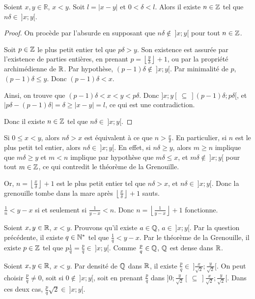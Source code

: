 \documentclass[]{../templates/homework}
\providecommand{\floor}[1]{\left \lfloor #1 \right \rfloor }
\begin{document}
\subproblem
\question
\begin{thm}
	Soient $x,y\in\mathbb R$, $x<y$. Soit $l = |x-y|$ et $0 < \delta < l$. Alors il existe $n\in \mathbb Z$ tel que $n\delta \in\ ]x;y[$.
\end{thm}
\begin{proof}
	On procède par l'absurde en supposant que $n\delta \not\in\ ]x;y[$ pour tout $n\in\mathbb Z$.
	
	Soit $p\in\mathbb Z$ le plus petit entier tel que $p\delta > y$. Son existence est assurée par l'existence de parties entières, en prenant $p = \floor {\frac y \delta} + 1$, ou par la propriété archimédienne de $\mathbb R$.
	Par hypothèse, $(p-1) \delta \not \in\ ]x;y[$. Par minimalité de $p$, $(p-1)\delta \leq y$. Donc $(p-1)\delta < x$.
	
	Ainsi, on trouve que $(p-1)\delta < x < y < p\delta$. Donc $]x;y[\ \subseteq \  ](p-1)\delta; p\delta[$, et $|p\delta - (p-1)\delta| = \delta \geq |x-y| = l$, ce qui est une contradiction.
	
	Donc il existe $n\in\mathbb Z$ tel que $n\delta \in \ ]x;y[$.
\end{proof}

\question Si $0 \leq x <y$, alors $n\delta > x$ est équivalent à ce que $n> \frac x \delta$. En particulier, si $n$ est le plus petit tel entier, alors $n\delta \in \ ]x;y[$. En effet, si $n\delta \geq y$, alors $m\geq n$ implique que $m\delta \geq y$ et $m < n$ implique par hypothèse que $m\delta \leq x$, et $m\delta \not\in\ ]x;y[$ pour tout $m\in\mathbb Z$, ce qui contredit le théorème de la Grenouille.

Or, $n = \floor {\frac x \delta} + 1$ est le plus petit entier tel que $n\delta > x$, et $n\delta \in\ ]x;y[$. Donc la grenouille tombe dans la mare après $\floor {\frac x \delta} + 1$ sauts.

\subproblem
\question $\frac 1 n < y-x$ si et seulement si $\frac 1 {y-x} < n$. Donc $n=\floor {\frac 1 {y-x}} + 1$ fonctionne.

\question Soient $x,y \in \mathbb R$, $x<y$. Prouvons qu'il existe $a\in\mathbb Q$, $a\in\ ]x;y[$.
Par la question précédente, il existe $q\in \mathbb N^*$ tel que $\frac 1 q < y-x$. Par le théorème de la Grenouille, il existe $p \in \mathbb Z$ tel que $p \frac 1 q = \frac p q \in \ ]x;y[$. Comme $\frac p q \in \mathbb Q$, $\mathbb Q$ est dense dans $\mathbb R$.

\question Soient $x,y \in \mathbb R$, $x<y$. Par densité de $\mathbb Q$ dans $\mathbb R$, il existe $\frac p q \in\ ]\frac x {\sqrt 2}; \frac y {\sqrt 2}[$. On peut choisir $\frac p q \neq 0$, soit si $0\not \in\ ]x;y[$, soit en prenant $\frac p q$ dans $]0;\frac y {\sqrt 2}[\ \subseteq\ ]\frac x {\sqrt 2}; \frac y {\sqrt 2}[$. Dans ces deux cas, $\frac p q \sqrt 2 \in\ ]x;y[$.
\end{document}
